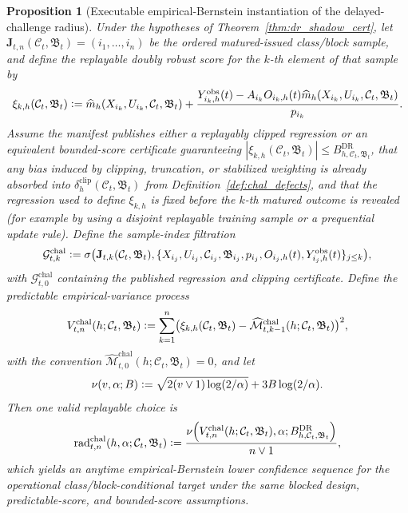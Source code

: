 \documentclass[11pt]{article}
\newtheorem{proposition}[theorem]{Proposition}
\theoremstyle{definition}
\newcommand{\1}{\mathbf{1}}
\newcommand{\Defeq}{\vcentcolon=}
\begin{document}
\begin{proposition}[Executable empirical-Bernstein instantiation of the delayed-challenge radius]\label{prop:chal_radius}
Under the hypotheses of Theorem~\ref{thm:dr_shadow_cert}, let $\mathbf J_{t,n}(\mathcal C_t,\mathfrak B_t)=(i_1,\dots,i_n)$ be the ordered matured-issued class/block sample, and define the replayable doubly robust score for the $k$-th element of that sample by
\[
\xi_{k,h}(\mathcal C_t,\mathfrak B_t)
\Defeq
\widehat m_h(X_{i_k},U_{i_k},\mathcal C_t,\mathfrak B_t)+\frac{Y_{i_k,h}^{\mathrm{obs}}(t)-A_{i_k}O_{i_k,h}(t)\widehat m_h(X_{i_k},U_{i_k},\mathcal C_t,\mathfrak B_t)}{p_{i_k}}.
\]
Assume the manifest publishes either a replayably clipped regression or an equivalent bounded-score certificate guaranteeing $|\xi_{k,h}(\mathcal C_t,\mathfrak B_t)|\le B_{h,\mathcal C_t,\mathfrak B_t}^{\mathrm{DR}}$, that any bias induced by clipping, truncation, or stabilized weighting is already absorbed into $\delta_h^{\mathrm{clip}}(\mathcal C_t,\mathfrak B_t)$ from Definition~\ref{def:chal_defects}, and that the regression used to define $\xi_{k,h}$ is fixed before the $k$-th matured outcome is revealed (for example by using a disjoint replayable training sample or a prequential update rule). Define the sample-index filtration
\[
\mathcal G_{t,k}^{\mathrm{chal}}\Defeq \sigma\bigl(\mathbf J_{t,k}(\mathcal C_t,\mathfrak B_t), \{X_{i_j},U_{i_j},\mathcal C_{i_j},\mathfrak B_{i_j},p_{i_j},O_{i_j,h}(t),Y_{i_j,h}^{\mathrm{obs}}(t)\}_{j\le k}\bigr),
\]
with $\mathcal G_{t,0}^{\mathrm{chal}}$ containing the published regression and clipping certificate. Define the predictable empirical-variance process
\[
V_{t,n}^{\mathrm{chal}}(h;\mathcal C_t,\mathfrak B_t)\Defeq \sum_{k=1}^{n}\bigl(\xi_{k,h}(\mathcal C_t,\mathfrak B_t)-\widehat{\mathcal M}_{t,k-1}^{\mathrm{chal}}(h;\mathcal C_t,\mathfrak B_t)\bigr)^2,
\]
with the convention $\widehat{\mathcal M}_{t,0}^{\mathrm{chal}}(h;\mathcal C_t,\mathfrak B_t)=0$, and let
\[
\nu(v,\alpha;B)\Defeq \sqrt{2(v\vee 1)\log(2/\alpha)}+3B\log(2/\alpha).
\]
Then one valid replayable choice is
\[
\operatorname{rad}_{t,n}^{\mathrm{chal}}(h,\alpha;\mathcal C_t,\mathfrak B_t)
\Defeq
\frac{\nu\!\left(V_{t,n}^{\mathrm{chal}}(h;\mathcal C_t,\mathfrak B_t),\alpha;B_{h,\mathcal C_t,\mathfrak B_t}^{\mathrm{DR}}\right)}{n\vee 1},
\]
which yields an anytime empirical-Bernstein lower confidence sequence for the operational class/block-conditional target under the same blocked design, predictable-score, and bounded-score assumptions.
\end{proposition}
\end{document}
